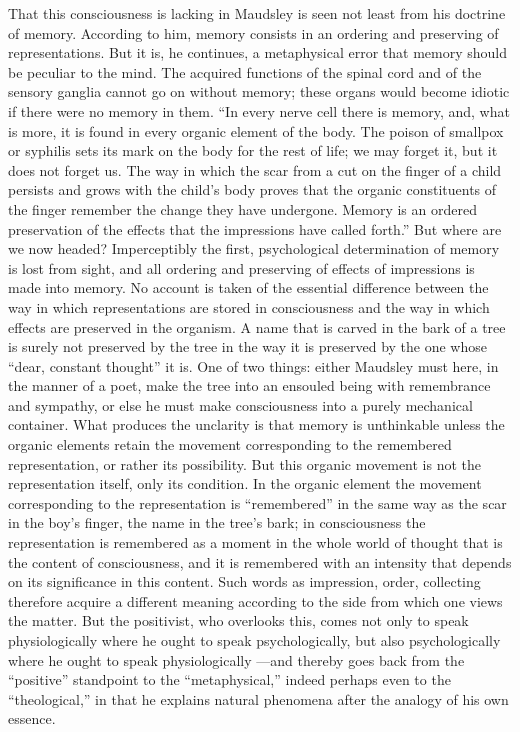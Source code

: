 \documentclass[12pt,a4paper,openany]{book}
\newcommand{\opage}[1]{\marginnote{\footnotesize\textit{[#1]}}}
\begin{document}
That this consciousness is lacking in Maudsley is seen not
least from his doctrine of memory. According to him, memory consists
in an ordering and preserving of representations. But
it is, he continues, a metaphysical error that memory
should be peculiar to the mind. The acquired functions of the spinal cord
and of the sensory ganglia cannot
go on without memory; these organs would become
idiotic if there were no memory in them. ``In every
nerve cell there is memory, and, what is more, it is found
in every organic element of the body. The poison of smallpox or syphilis
sets its mark on the body for the rest
of life; we may forget it, but it does not forget us.
The way in which the scar from a cut on the finger
of a child persists and grows with the child's body
proves that the organic constituents of the finger remember the
change they have undergone. Memory is an ordered
preservation of the effects that the impressions have called forth.''
But where are we now headed? Imperceptibly the first, psychological
determination of memory is lost from sight, and all
ordering and preserving of effects of impressions is made into
memory. No account is taken of the essential difference
between the way in which representations are stored
in consciousness and the way in which effects are preserved in the organism.
A name that is carved in the bark of a tree
is surely not preserved by the tree in the way it is preserved by the one
whose ``dear, constant thought'' it is. One of two things: either
Maudsley must here, in the manner of a poet, make the tree into an ensouled
being with remembrance and sympathy, or else he must
make consciousness into a purely mechanical container. What
produces the unclarity is that memory is unthinkable
unless the organic elements retain the movement corresponding to the remembered
representation, or rather its possibility.
But this organic movement is not the representation itself,
only its condition. In the organic element the
\opage{320}movement corresponding to the representation is ``remembered'' in the same way as
the scar in the boy's finger, the name in the tree's bark; in consciousness
the representation is remembered as a moment in the whole
world of thought that is the content of consciousness, and it is remembered
with an intensity that depends on its significance in this
content. Such words as impression, order, collecting
therefore acquire a different meaning according to the side from which
one views the matter. But the positivist, who overlooks this,
comes not only to speak physiologically where he ought to speak
psychologically, but also psychologically where he ought to speak physiologically
---and thereby goes back from the ``positive'' standpoint
to the ``metaphysical,'' indeed perhaps even to the ``theological,''
in that he explains natural phenomena after the analogy of his own
essence.
\end{document}
